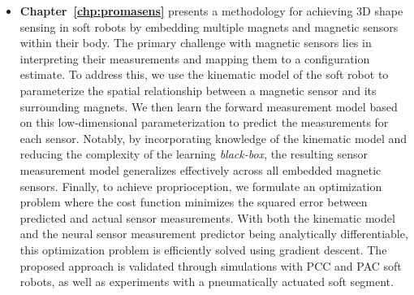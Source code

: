 \begin{itemize}
    \item \textbf{Chapter~\ref{chp:promasens}} presents a methodology for achieving 3D shape sensing in soft robots by embedding multiple magnets and magnetic sensors within their body. The primary challenge with magnetic sensors lies in interpreting their measurements and mapping them to a configuration estimate. To address this, we use the kinematic model of the soft robot to parameterize the spatial relationship between a magnetic sensor and its surrounding magnets. We then learn the forward measurement model based on this low-dimensional parameterization to predict the measurements for each sensor. Notably, by incorporating knowledge of the kinematic model and reducing the complexity of the learning \emph{black-box}, the resulting sensor measurement model generalizes effectively across all embedded magnetic sensors. Finally, to achieve proprioception, we formulate an optimization problem where the cost function minimizes the squared error between predicted and actual sensor measurements. With both the kinematic model and the neural sensor measurement predictor being analytically differentiable, this optimization problem is efficiently solved using gradient descent. The proposed approach is validated through simulations with \gls{PCC} and \gls{PAC} soft robots, as well as experiments with a pneumatically actuated soft segment.

\end{itemize}
